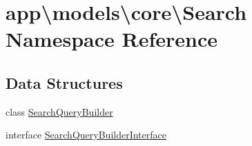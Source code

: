 \hypertarget{namespaceapp_1_1models_1_1core_1_1_search}{\section{app\textbackslash{}models\textbackslash{}core\textbackslash{}Search Namespace Reference}
\label{namespaceapp_1_1models_1_1core_1_1_search}
}
\subsection*{Data Structures}
\begin{DoxyCompactItemize}
\item 
class \hyperlink{classapp_1_1models_1_1core_1_1_search_1_1_search_query_builder}{Search\-Query\-Builder}
\item 
interface \hyperlink{interfaceapp_1_1models_1_1core_1_1_search_1_1_search_query_builder_interface}{Search\-Query\-Builder\-Interface}
\end{DoxyCompactItemize}

